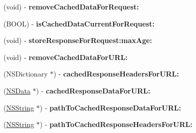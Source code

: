 \begin{DoxyCompactItemize}
\item 
\hypertarget{protocol_a_s_i_cache_delegate-p_a2e34141ed1db825ca2d1c292b068193e}{
(void) -\/ {\bfseries remove\-Cached\-Data\-For\-Request\-:}}
\label{protocol_a_s_i_cache_delegate-p_a2e34141ed1db825ca2d1c292b068193e}

\item 
\hypertarget{protocol_a_s_i_cache_delegate-p_a67c31b3473af7adba4cd548045935ac2}{
(\-B\-O\-O\-L) -\/ {\bfseries is\-Cached\-Data\-Current\-For\-Request\-:}}
\label{protocol_a_s_i_cache_delegate-p_a67c31b3473af7adba4cd548045935ac2}

\item 
\hypertarget{protocol_a_s_i_cache_delegate-p_ae7cfacf47d3d24e151530c033f993734}{
(void) -\/ {\bfseries store\-Response\-For\-Request\-:max\-Age\-:}}
\label{protocol_a_s_i_cache_delegate-p_ae7cfacf47d3d24e151530c033f993734}

\item 
\hypertarget{protocol_a_s_i_cache_delegate-p_aa2d162430d8c9bc47057030b3e305f18}{
(void) -\/ {\bfseries remove\-Cached\-Data\-For\-U\-R\-L\-:}}
\label{protocol_a_s_i_cache_delegate-p_aa2d162430d8c9bc47057030b3e305f18}

\item 
\hypertarget{protocol_a_s_i_cache_delegate-p_ab7b267fc153dcf624c91e2d07513f868}{
(\-N\-S\-Dictionary $\ast$) -\/ {\bfseries cached\-Response\-Headers\-For\-U\-R\-L\-:}}
\label{protocol_a_s_i_cache_delegate-p_ab7b267fc153dcf624c91e2d07513f868}

\item 
\hypertarget{protocol_a_s_i_cache_delegate-p_a24c0d2a6834e5a0332f3d95198fc681c}{
(\hyperlink{class_n_s_data}{\-N\-S\-Data} $\ast$) -\/ {\bfseries cached\-Response\-Data\-For\-U\-R\-L\-:}}
\label{protocol_a_s_i_cache_delegate-p_a24c0d2a6834e5a0332f3d95198fc681c}

\item 
\hypertarget{protocol_a_s_i_cache_delegate-p_a692463be3a5c9abe5a239eb761431799}{
(\hyperlink{class_n_s_string}{\-N\-S\-String} $\ast$) -\/ {\bfseries path\-To\-Cached\-Response\-Data\-For\-U\-R\-L\-:}}
\label{protocol_a_s_i_cache_delegate-p_a692463be3a5c9abe5a239eb761431799}

\item 
\hypertarget{protocol_a_s_i_cache_delegate-p_a0cab288cf23b1d6adb76981ed591d324}{
(\hyperlink{class_n_s_string}{\-N\-S\-String} $\ast$) -\/ {\bfseries path\-To\-Cached\-Response\-Headers\-For\-U\-R\-L\-:}}
\label{protocol_a_s_i_cache_delegate-p_a0cab288cf23b1d6adb76981ed591d324}


\end{DoxyCompactItemize}
